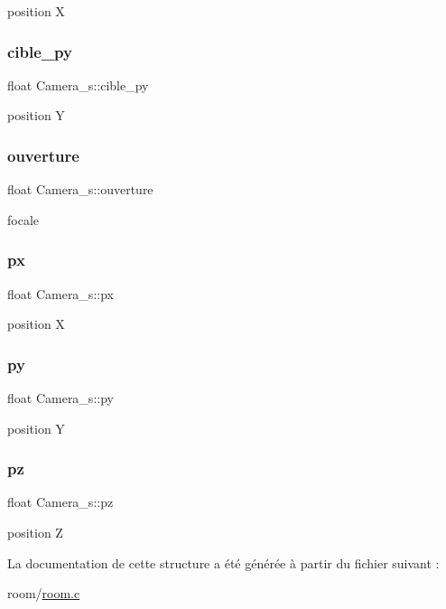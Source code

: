position X \mbox{\label{struct_camera__s_ab114eea48a0a3a97349ee604f0706dac}} 
\subsubsection{\texorpdfstring{cible\+\_\+py}{cible\_py}}
{\footnotesize\ttfamily float Camera\+\_\+s\+::cible\+\_\+py}

position Y \mbox{\label{struct_camera__s_ae83a4764a575d421af71ff8ce2969232}} 
\subsubsection{\texorpdfstring{ouverture}{ouverture}}
{\footnotesize\ttfamily float Camera\+\_\+s\+::ouverture}

focale \mbox{\label{struct_camera__s_a9d7dbf683174c3264b44409071db6569}} 
\subsubsection{\texorpdfstring{px}{px}}
{\footnotesize\ttfamily float Camera\+\_\+s\+::px}

position X \mbox{\label{struct_camera__s_a5512b12007600db0cd53ee8b4bea0e06}} 
\subsubsection{\texorpdfstring{py}{py}}
{\footnotesize\ttfamily float Camera\+\_\+s\+::py}

position Y \mbox{\label{struct_camera__s_af7d42d26829bcdd288cc1fe2bd53e2d4}} 
\subsubsection{\texorpdfstring{pz}{pz}}
{\footnotesize\ttfamily float Camera\+\_\+s\+::pz}

position Z 

La documentation de cette structure a été générée à partir du fichier suivant \+:\begin{DoxyCompactItemize}
\item 
room/\hyperlink{room_8c}{room.\+c}\end{DoxyCompactItemize}
